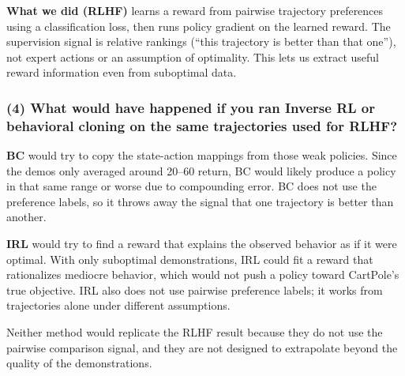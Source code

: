\documentclass[11pt]{article}
\begin{document}
\textbf{What we did (RLHF)} learns a reward from pairwise trajectory preferences using a classification loss, then runs policy gradient on the learned reward. The supervision signal is relative rankings (``this trajectory is better than that one''), not expert actions or an assumption of optimality. This lets us extract useful reward information even from suboptimal data.

\subsubsection*{(4) What would have happened if you ran Inverse RL or behavioral cloning on the same trajectories used for RLHF?}

\textbf{BC} would try to copy the state-action mappings from those weak policies. Since the demos only averaged around 20--60 return, BC would likely produce a policy in that same range or worse due to compounding error. BC does not use the preference labels, so it throws away the signal that one trajectory is better than another.

\textbf{IRL} would try to find a reward that explains the observed behavior as if it were optimal. With only suboptimal demonstrations, IRL could fit a reward that rationalizes mediocre behavior, which would not push a policy toward CartPole's true objective. IRL also does not use pairwise preference labels; it works from trajectories alone under different assumptions.

Neither method would replicate the RLHF result because they do not use the pairwise comparison signal, and they are not designed to extrapolate beyond the quality of the demonstrations.
\end{document}
